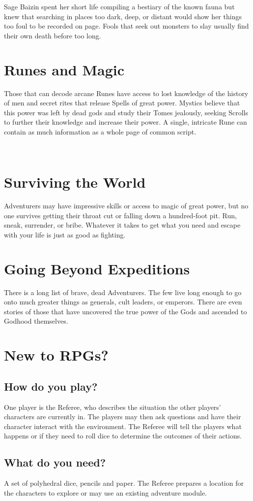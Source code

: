 \documentclass[itdr]{subfiles}
\begin{document}
Sage Baizin spent her short life compiling a bestiary of the known fauna but knew that searching in places too dark, deep, or distant would show her things too foul to be recorded on page. Fools that seek out monsters to slay usually find their own death before too long.

\section*{Runes and Magic}

Those that can decode arcane Runes have access to lost knowledge of the history of men and secret rites that release Spells of great power. Mystics believe that this power was left by dead gods and study their Tomes jealously, seeking Scrolls to further their knowledge and increase their power. A single, intricate Rune can contain as much information as a whole page of common script.

\vfill
\break

~\vspace{-17.5pt}
\section*{Surviving the World}

Adventurers may have impressive skills or access to magic of great power, but no one survives getting their throat cut or falling down a hundred-foot pit. Run, sneak, surrender, or bribe. Whatever it takes to get what you need and escape with your life is just as good as fighting.

\section*{Going Beyond Expeditions}

There is a long list of brave, dead Adventurers. The few live long enough to go onto much greater things as generals, cult leaders, or emperors. There are even stories of those that have uncovered the true power of the Gods and ascended to Godhood themselves.

\vspace{3.5pt}

\section*{New to RPGs?}

\subsection*{How do you play?}
One player is the Referee, who describes the situation the other players' characters are currently in. The players may then ask questions and have their character interact with the environment. The Referee will tell the players what happens or if they need to roll dice to determine the outcomes of their actions.

\subsection*{What do you need?}
A set of polyhedral dice, pencils and paper. The Referee prepares a location for the characters to explore or may use an existing adventure module.
\end{document}
